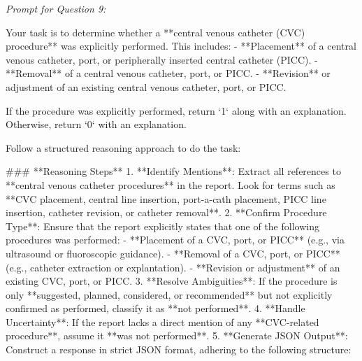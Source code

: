 \textit{\normalsize Prompt for Question  9:}
\begin{mdframed}[]
\normalsize

Your task is to determine whether a **central venous catheter (CVC) procedure** was explicitly performed. This includes:  
- **Placement** of a central venous catheter, port, or peripherally inserted central catheter (PICC).  
- **Removal** of a central venous catheter, port, or PICC.  
- **Revision** or adjustment of an existing central venous catheter, port, or PICC.  

If the procedure was explicitly performed, return `1` along with an explanation. Otherwise, return `0` with an explanation.

Follow a structured reasoning approach to do the task:

### **Reasoning Steps**  
1. **Identify Mentions**: Extract all references to **central venous catheter procedures** in the report. Look for terms such as **CVC placement, central line insertion, port-a-cath placement, PICC line insertion, catheter revision, or catheter removal**.  
2. **Confirm Procedure Type**: Ensure that the report explicitly states that one of the following procedures was performed:  
   - **Placement of a CVC, port, or PICC** (e.g., via ultrasound or fluoroscopic guidance).  
   - **Removal of a CVC, port, or PICC** (e.g., catheter extraction or explantation).  
   - **Revision or adjustment** of an existing CVC, port, or PICC.  
3. **Resolve Ambiguities**: If the procedure is only **suggested, planned, considered, or recommended** but not explicitly confirmed as performed, classify it as **not performed**.  
4. **Handle Uncertainty**: If the report lacks a direct mention of any **CVC-related procedure**, assume it **was not performed**.  
5. **Generate JSON Output**: Construct a response in strict JSON format, adhering to the following structure:  
\end{mdframed}

